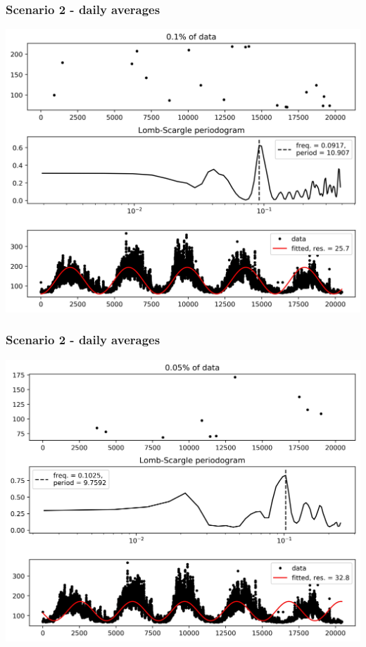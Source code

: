 \documentclass{beamer}
\begin{document}
\begin{frame}
\frametitle{Scenario 2 - daily averages}
\begin{center}
\includegraphics[scale=0.55]{../scripts/dataset1/periodograms_ny2.0_model1_pg0.999.jpg}
\end{center}
\end{frame}
\begin{frame}
\frametitle{Scenario 2 - daily averages}
\begin{center}
\includegraphics[scale=0.55]{../scripts/dataset1/periodograms_ny2.0_model1_pg0.9995.jpg}
\end{center}
\end{frame}
\end{document}

